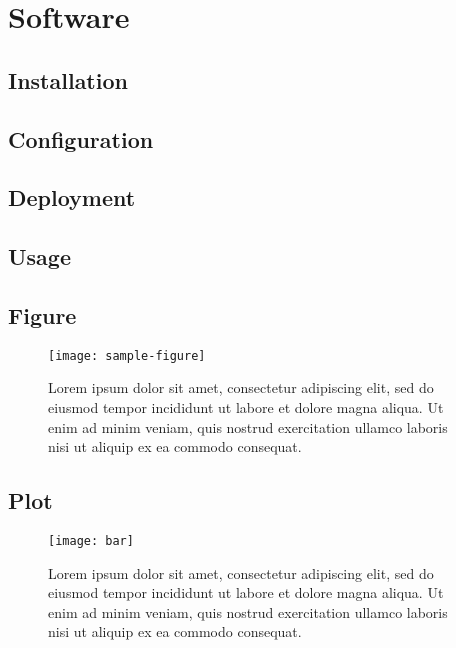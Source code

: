 \chapter{Software}
\label{ch:software}


\lipsum[1]


\section{Installation}
\label{sec:installation}

\lipsum[1]


\section{Configuration}
\label{sec:configuration}

\lipsum[1]


\section{Deployment}
\label{sec:deployment}

\lipsum[1]


\section{Usage}
\label{sec:usage}

\lipsum[1]


\section*{Figure}

\begin{figure}	
	\label{fig:sample-figure}
	\centering
	\texttt{[image: sample-figure]}
	\caption{Lorem ipsum dolor sit amet, consectetur adipiscing elit, sed do eiusmod tempor incididunt ut labore et dolore magna aliqua. Ut enim ad minim veniam, quis nostrud exercitation ullamco laboris nisi ut aliquip ex ea commodo consequat.}
\end{figure}

\section*{Plot}

\begin{figure}	
	\label{fig:sample-bar}
	\centering
	\texttt{[image: bar]}
	\caption{Lorem ipsum dolor sit amet, consectetur adipiscing elit, sed do eiusmod tempor incididunt ut labore et dolore magna aliqua. Ut enim ad minim veniam, quis nostrud exercitation ullamco laboris nisi ut aliquip ex ea commodo consequat.}
\end{figure}

